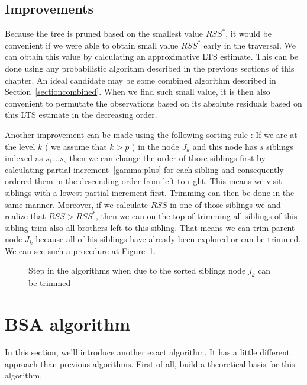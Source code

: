 \subsection{Improvements}
Because the tree is pruned based on the smallest value $RSS^*$, it would be convenient if we were able to obtain small value $RSS^*$ early in the traversal. We can obtain this value by calculating an approximative LTS estimate. This can be done using any probabilistic algorithm described in the previous sections of this chapter. An ideal candidate may be some combined algorithm described in Section~\ref{sectioncombined}. When we find such small value, it is then also convenient to permutate the observations based on its absolute residuals based on this LTS estimate in the decreasing order.

Another improvement can be made using the following sorting rule : If we are at the level $k$ ( we assume that $k > p$ )
in the node $J_k$ and this node has $s$ siblings indexed as $s_1 \ldots s_s$ then we can change the order of those siblings first by calculating partial increment~\eqref{gamma:plus} for each sibling and consequently ordered them in the descending order from left to right. This means we visit siblings with a lowest partial increment first. Trimming can then be done in the same manner. Moreover, if we calculate $RSS$ in one of those siblings we and realize that $RSS > RSS^*$, then we can on the top of trimming all siblings of this sibling trim also all brothers left to this sibling. That means we can trim parent node $J_k$ because all of his siblings have already been explored or can be trimmed. We can see such a procedure at Figure~\ref{figure:sorting:rule}.

\begin{figure}[h]
\centering
{}
\caption{Step in the algorithms when due to the sorted siblings node $j_k$ can be trimmed}
\label{figure:sorting:rule}
\end{figure}





\section{BSA algorithm}
In this section, we'll introduce another exact algorithm. It has a little different approach than previous algorithms. First of all, build a theoretical basis for this algorithm.



